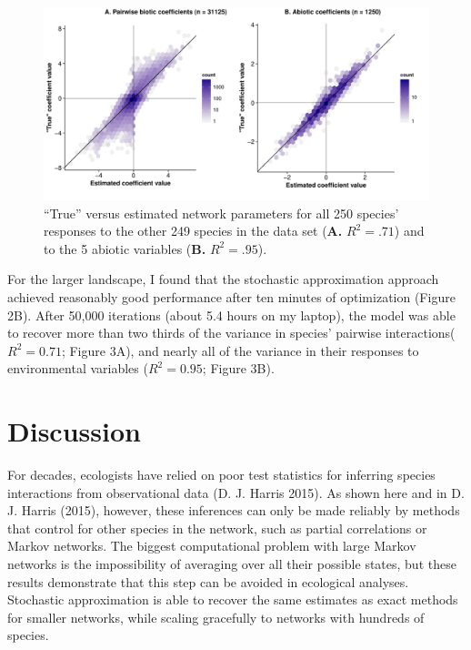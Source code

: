 \begin{figure}[htbp]
\centering
\includegraphics{estimates.pdf}
\caption{``True'' versus estimated network parameters for all 250
species' responses to the other 249 species in the data set (\textbf{A.}
\(R^2 = .71\)) and to the 5 abiotic variables (\textbf{B.}
\(R^2 = .95\)).}
\end{figure}

For the larger landscape, I found that the stochastic approximation
approach achieved reasonably good performance after ten minutes of
optimization (Figure 2B). After 50,000 iterations (about 5.4 hours on my
laptop), the model was able to recover more than two thirds of the
variance in species' pairwise interactions(\(R^2 = 0.71\); Figure 3A),
and nearly all of the variance in their responses to environmental
variables (\(R^2 = 0.95\); Figure 3B).

\section{Discussion}\label{discussion}

For decades, ecologists have relied on poor test statistics for
inferring species interactions from observational data (D. J. Harris
2015). As shown here and in D. J. Harris (2015), however, these
inferences can only be made reliably by methods that control for other
species in the network, such as partial correlations or Markov networks.
The biggest computational problem with large Markov networks is the
impossibility of averaging over all their possible states, but these
results demonstrate that this step can be avoided in ecological
analyses. Stochastic approximation is able to recover the same estimates
as exact methods for smaller networks, while scaling gracefully to
networks with hundreds of species.

